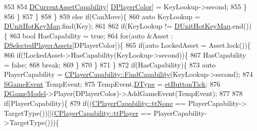 \begin{DoxyCode}
853                             
854                             \hyperlink{classCApplicationData_a7e0dbfdc54f73dfa9838ae81b8017e2d}{DCurrentAssetCapability}[
      \hyperlink{classCApplicationData_a53550939b20cba70570f113e4d1c5d02}{DPlayerColor}] = KeyLookup->second;
855                         \}
856                     \}
857                 \}
858             \}
859             \textcolor{keywordflow}{else} \textcolor{keywordflow}{if}(CanMove)\{
860                 \textcolor{keyword}{auto} KeyLookup = \hyperlink{classCApplicationData_ae0c7b5849264d7234ffb160d54650f9a}{DUnitHotKeyMap}.find(Key);
861                 
862                 \textcolor{keywordflow}{if}(KeyLookup != \hyperlink{classCApplicationData_ae0c7b5849264d7234ffb160d54650f9a}{DUnitHotKeyMap}.end())\{
863                     \textcolor{keywordtype}{bool} HasCapability = \textcolor{keyword}{true};
864                     \textcolor{keywordflow}{for}(\textcolor{keyword}{auto} &Asset : \hyperlink{classCApplicationData_a05c1087d5a5c4ddc14fcb37444f1642b}{DSelectedPlayerAssets}[DPlayerColor])\{
865                         \textcolor{keywordflow}{if}(\textcolor{keyword}{auto} LockedAsset = Asset.lock())\{   
866                             \textcolor{keywordflow}{if}(!LockedAsset->HasCapability(KeyLookup->second))\{
867                                 HasCapability = \textcolor{keyword}{false};
868                                 \textcolor{keywordflow}{break};
869                             \}
870                         \}
871                     \}
872                     \textcolor{keywordflow}{if}(HasCapability)\{
873                         \textcolor{keyword}{auto} PlayerCapability = 
      \hyperlink{classCPlayerCapability_a881ba4b87385d7cfe5cb6ced2d26f226}{CPlayerCapability::FindCapability}(KeyLookup->second); 
874                         \hyperlink{structSGameEvent}{SGameEvent} TempEvent;
875                         TempEvent.\hyperlink{structSGameEvent_afa10562e243f4ac2b473b655cc58fee7}{DType} = \hyperlink{GameModel_8h_abfcf510bafec7c6429906a6ecaac656dafe7284f9af34794514e5dbfe974e3296}{etButtonTick};
876                         \hyperlink{classCApplicationData_a32b50c7c1cbac3cfd67c7f775b1d6fee}{DGameModel}->Player(DPlayerColor)->AddGameEvent(TempEvent);
877             
878                         \textcolor{keywordflow}{if}(PlayerCapability)\{
879                             \textcolor{keywordflow}{if}((\hyperlink{classCPlayerCapability_a9d3450ed1532fd536bd6cbb1e2eef02fac78f0e806a6b0ead030d63c27c9ce929}{CPlayerCapability::ttNone} == PlayerCapability->
      TargetType())||(\hyperlink{classCPlayerCapability_a9d3450ed1532fd536bd6cbb1e2eef02fafa6672fe0ac4e39cb5908cd5438b824f}{CPlayerCapability::ttPlayer} == PlayerCapability->TargetType()))\{

\end{DoxyCode}
